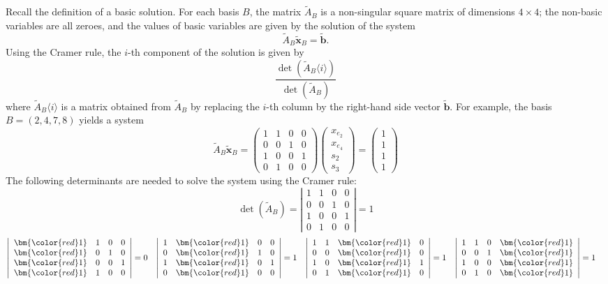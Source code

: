 \noindent
Recall the definition of a basic solution. For each basis $B$, the matrix   $\tilde{A}_B$
is a non-singular square matrix of dimensions $4\times 4$; the non-basic variables are all zeroes, and the 
values of basic variables are given by the solution of the system 
$$\tilde{A}_B\bm{\tilde{x}}_B=\bm{\tilde{b}}.$$
Using the Cramer rule, the $i$-th component of the solution is given by
$$\frac{\det\left(\tilde{A}_B\langle i\rangle\right)}{\det\left(\tilde{A}_B\right)}$$
where $\tilde{A}_B\langle i\rangle$ is a matrix obtained from  $\tilde{A}_B$
by replacing the $i$-th column by the right-hand side vector $\bm{\tilde{b}}$.
For example, the basis $B=(2,4,7,8)$ yields a system
$$\tilde{A}_B\bm{\tilde{x}}_B=\left(\begin{array}{cccc}1&1&0&0\\0&0&1&0\\1&0&0&1\\0&1&0&0\end{array}\right)
\left(\begin{array}{c}x_{e_2}\\x_{e_4}\\s_2\\s_3\end{array}\right)=
\left(\begin{array}{c}1\\1\\1\\1\end{array}\right)
$$
The following determinants are needed to solve the system using the Cramer rule:
$$\det\left(\tilde{A}_B\right)=\left|\begin{array}{cccc}1&1&0&0\\0&0&1&0\\1&0&0&1\\0&1&0&0\end{array}\right|=1$$
\renewcommand{\tmp}{\bm{{\color{red}1}}}
\begin{align*}
\left|\begin{array}{cccc}\tmp&1&0&0\\\tmp&0&1&0\\\tmp&0&0&1\\\tmp&1&0&0\end{array}\right|&=0&
\left|\begin{array}{cccc}1&\tmp&0&0\\0&\tmp&1&0\\1&\tmp&0&1\\0&\tmp&0&0\end{array}\right|&=1&
\left|\begin{array}{cccc}1&1&\tmp&0\\0&0&\tmp&0\\1&0&\tmp&1\\0&1&\tmp&0\end{array}\right|&=1&
\left|\begin{array}{cccc}1&1&0&\tmp\\0&0&1&\tmp\\1&0&0&\tmp\\0&1&0&\tmp\end{array}\right|&=1
\end{align*}
